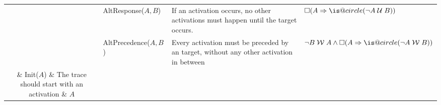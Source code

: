 \documentclass[sigconf]{acmart}
\makeatletter
\DeclareRobustCommand{\iscircle}{\mathord{\mathpalette\is@circle\relax}}
\newcommand\is@circle[2]{%
  \begingroup
  \sbox\z@{\raisebox{\depth}{$\m@th#1\bigcirc$}}%
  \sbox\tw@{$#1\square$}%
  \resizebox{!}{\ht\tw@}{\usebox{\z@}}%
  \endgroup
}
\newcommand{\Next}{\ensuremath{\iscircle}}
\newcommand{\Globally}{\ensuremath{\square}}
\newcommand{\Future}{\ensuremath{\Diamond}}
\newcommand{\WeakUntil}[2]{\ensuremath{{#1}\;\mathcal{W}\;{#2}}}
\newcommand{\DUntil}[2]{\ensuremath{{#1}\;\mathcal{U}\;{#2}}}
\newcommand{\DeclareClause}[5]{\textsf{#1}(\texttt{#2},\texttt{#4})}
\newcommand{\DeclareClauseNoData}[3]{\textsf{#1}(\texttt{#2},\texttt{#3})}
\makeatother
\begin{document}
\begin{table}[!th]
{\begin{tabular}{c|l|p{9cm}|l}
			& \textsf{AltResponse($A,B$) }  & If an activation occurs, no other activations must happen until the target occurs.  & $\Globally(A\Rightarrow\Next(\DUntil{\neg A}{B}))$\\
			& \textsf{AltPrecedence($A,B$) }  & Every activation must be preceded by an target, without any other
			activation in between &   $\WeakUntil{\neg B}{A}\wedge \Globally(A\Rightarrow \Next(\WeakUntil{\neg A}{B }))$\\
\midrule
	  \parbox[t]{2mm}{}  & \textsf{Init($A$)} & The trace should start with an activation & $A$\\
	 & \textsf{Exists($A,n$)} & Activations should occur at least $n$ times & $\Future(A\wedge \Next (\llbracket\textsf{Exists} (A,n-1)\rrbracket))$\\
	 & \textsf{Absence($A,n+1$)}  & Activations should occur at most $n$ times & $\neg \llbracket\textsf{Exists}$($A,n+1$)$\rrbracket$\\
	 & \textsf{Precedence($A,B$)}  & Events preceding the activations should not satisfy the target & $\WeakUntil{\neg B}{A}$\\
	& \textsf{Choice($A,A'$) }  & One of the two activation  conditions must appear. & $\Future A\vee\Future A'$ \\
	 & \textsf{Response($A,B$) } & The activation is either followed by or simultaneous to  the target. & $\Globally(A\Rightarrow\Future B)$ \\
	 & \textsf{RespExistence($A,B$) }  & The activation requires the existence of the target.& $\Future A\Rightarrow\Future B$ \\
	 & \textsf{ExlChoice($A,A'$) } & Only one activation condition must happen. & $\llbracket\DeclareClause{Choice}{A}{p}{A'}{p'}\rrbracket\wedge \llbracket\DeclareClause{NotCoExistence}{A}{p}{A'}{p'}\rrbracket$\\ 
	 & \textsf{CoExistence($A,B$) }  & \textsf{RespExistence}, and vice versa. & $ \llbracket\DeclareClauseNoData{RespExistence}{A}{B}\rrbracket\wedge \llbracket\DeclareClauseNoData{RespExistence}{B}{A}\rrbracket$\\
	 & \textsf{Succession($A,B$) }  & The target should only follow the activation. & $\llbracket\DeclareClauseNoData{Precedence}{A}{B}\rrbracket\wedge \llbracket\DeclareClauseNoData{Response}{A}{B}\rrbracket$\\

	 & \textsf{ChainSuccession($A,B$) }  & Activation immediately follows the target, and the target immediately preceeds the activation. & $\Globally(A\Leftrightarrow\Next B)$\\

	 
	& \textsf{NotCoExistence($A,B$) } & The activation \texttt{nand} the target happen.&  $\neg(\Future A \wedge\Future B)$\\
	 & \textsf{NotSuccession($A,B$)} & The activation requires that no target condition should follow.& $\Globally(A\Rightarrow \neg\Future B)$ \\
			\bottomrule
	\end{tabular}}
\end{table}
\end{document}
